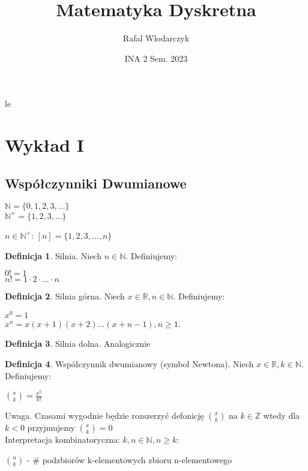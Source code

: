 le\documentclass{article}
\author{Rafal Wlodarczyk}
\title{Matematyka Dyskretna}
\date{INA 2 Sem. 2023}
\theoremstyle{definition}
\newtheorem{de}{Definicja}[subsection]
\theoremstyle{definition}
\theoremstyle{definition}
\theoremstyle{definition}
\begin{document}
\maketitle

\section{Wykład I}

\subsection{Współczynniki Dwumianowe}

\begin{center}
  $\mathbb{N}=\{0,1,2,3,\dots\}$\\
  $\mathbb{N}^{+}=\{1,2,3,\dots\}$
\end{center}

$n\in\mathbb{N}^{+}$: $[n]=\{1,2,3,\dots,n\}$

\begin{de}
  Silnia. Niech $n\in\mathbb{N}$. Definiujemy:
  \begin{center}
    $0!=1$\\
    $n!=1\cdot2\cdot \dots \cdot n$
  \end{center}
\end{de}

\begin{de}
  Silnia górna. Niech $x\in \mathbb{R}, n\in \mathbb{N}$. Definiujemy:
  \begin{center}
    $x^0 = 1$\\
    $x^n = x(x+1)(x+2)\dots (x+n-1), n\geq 1$.
  \end{center}
\end{de}

\begin{de}
  Silnia dolna. Analogicznie
\end{de}

\begin{de}
  Współczynnik dwumianowy (symbol Newtona). Niech $x\in\mathbb{R}, k\in\mathbb{N}$. Definiujemy:
  \begin{center}
    $\binom{x}{k} = \frac{x^{\underline{k}}}{k!}$
  \end{center}
\end{de}
Uwaga. Czasami wygodnie będzie rozszerzyć defonicję $\binom{x}{k}$ na $k\in\mathbb{Z}$ wtedy dla $k<0$ przyjmujemy $\binom{x}{k}=0$\\
Interpretacja kombinatoryczna: $k, n\in\mathbb{N}, n\geq k$:\\
\begin{center}
  $\binom{n}{k}$ - \# podzbiorów k-elementowych zbioru n-elementowego
\end{center}
\end{document}
